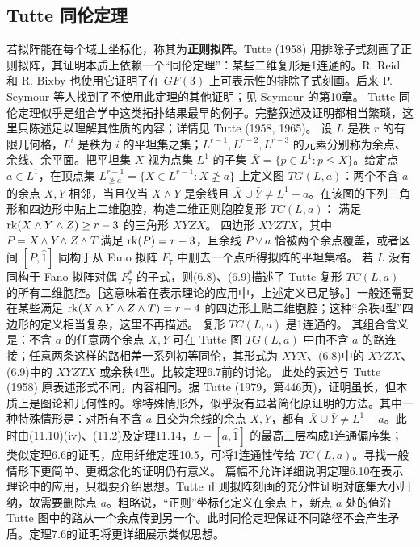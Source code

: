 \subsection*{Tutte 同伦定理}
若拟阵能在每个域上坐标化，称其为\textbf{正则拟阵}。Tutte (1958) 用排除子式刻画了正则拟阵，其证明本质上依赖一个“同伦定理”：某些二维复形是1连通的。R. Reid 和 R. Bixby 也使用它证明了在 $GF(3)$ 上可表示性的排除子式刻画。后来 P. Seymour 等人找到了不使用此定理的其他证明；见 Seymour 的第10章。
Tutte 同伦定理似乎是组合学中这类拓扑结果最早的例子。完整叙述及证明都相当繁琐，这里只陈述足以理解其性质的内容；详情见 Tutte (1958, 1965)。
设 $L$ 是秩 $r$ 的有限几何格，$L^i$ 是秩为 $i$ 的平坦集之集；$L^{r-1},L^{r-2},L^{r-3}$ 的元素分别称为余点、余线、余平面。把平坦集 $X$ 视为点集 $L^1$ 的子集 $\bar X=\{p\in L^1:p\le X\}$。给定点 $a\in L^1$，在顶点集 $L^{r-1}_{\not\ge a}=\{X\in L^{r-1}:X\not\ge a\}$ 上定义图 $TG(L,a)$：两个不含 $a$ 的余点 $X,Y$ 相邻，当且仅当 $X\wedge Y$ 是余线且 $\bar X\cup\bar Y\ne L^1-a$。在该图的下列三角形和四边形中贴上二维胞腔，构造二维正则胞腔复形 $TC(L,a)$：
满足 $\operatorname{rk}(X\wedge Y\wedge Z)\ge r-3$ 的三角形 $XYZX$。
四边形 $XYZTX$，其中 $P=X\wedge Y\wedge Z\wedge T$ 满足 $\operatorname{rk}(P)=r-3$，且余线 $P\vee a$ 恰被两个余点覆盖，或者区间 $[P,\hat1]$ 同构于从 Fano 拟阵 $F_7$ 中删去一个点所得拟阵的平坦集格。
若 $L$ 没有同构于 Fano 拟阵对偶 $F_7^*$ 的子式，则(6.8)、(6.9)描述了 Tutte 复形 $TC(L,a)$ 的所有二维胞腔。［这意味着在表示理论的应用中，上述定义已足够。］一般还需要在某些满足 $\operatorname{rk}(X\wedge Y\wedge Z\wedge T)=r-4$ 的四边形上贴二维胞腔；这种“余秩4型”四边形的定义相当复杂，这里不再描述。
复形 $TC(L,a)$ 是1连通的。
其组合含义是：不含 $a$ 的任意两个余点 $X,Y$ 可在 Tutte 图 $TG(L,a)$ 中由不含 $a$ 的路连接；任意两条这样的路相差一系列初等同伦，其形式为 $XYX$、(6.8)中的 $XYZX$、(6.9)中的 $XYZTX$ 或余秩4型。比较定理6.7前的讨论。
此处的表述与 Tutte (1958) 原表述形式不同，内容相同。据 Tutte (1979，第446页)，证明虽长，但本质上是图论和几何性的。除特殊情形外，似乎没有显著简化原证明的方法。其中一种特殊情形是：对所有不含 $a$ 且交为余线的余点 $X,Y$，都有 $\bar X\cup\bar Y\ne L^1-a$。此时由(11.10)(iv)、(11.2)及定理11.14，$L-[a,\hat1]$ 的最高三层构成1连通偏序集；类似定理6.6的证明，应用纤维定理10.5，可将1连通性传给 $TC(L,a)$。寻找一般情形下更简单、更概念化的证明仍有意义。
篇幅不允许详细说明定理6.10在表示理论中的应用，只概要介绍思想。Tutte 正则拟阵刻画的充分性证明对底集大小归纳，故需要删除点 $a$。粗略说，“正则”坐标化定义在余点上，新点 $a$ 处的值沿 Tutte 图中的路从一个余点传到另一个。此时同伦定理保证不同路径不会产生矛盾。定理7.6的证明将更详细展示类似思想。
